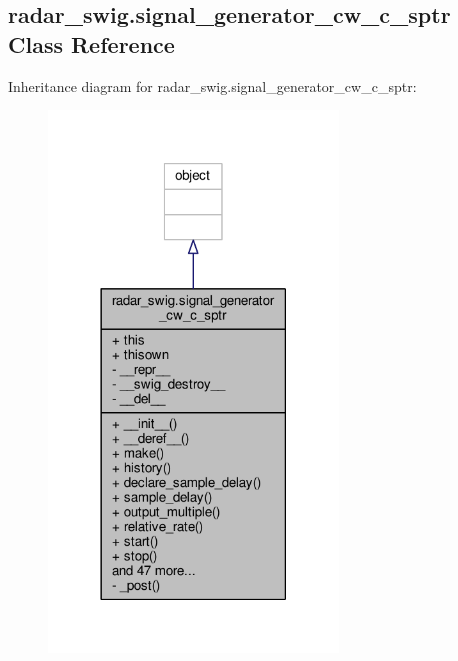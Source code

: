 \subsection{radar\+\_\+swig.\+signal\+\_\+generator\+\_\+cw\+\_\+c\+\_\+sptr Class Reference}
\label{classradar__swig_1_1signal__generator__cw__c__sptr}


Inheritance diagram for radar\+\_\+swig.\+signal\+\_\+generator\+\_\+cw\+\_\+c\+\_\+sptr\+:
\nopagebreak
\begin{figure}[H]
\begin{center}
\leavevmode
\includegraphics[width=218pt]{d9/d8e/classradar__swig_1_1signal__generator__cw__c__sptr__inherit__graph}
\end{center}
\end{figure}


